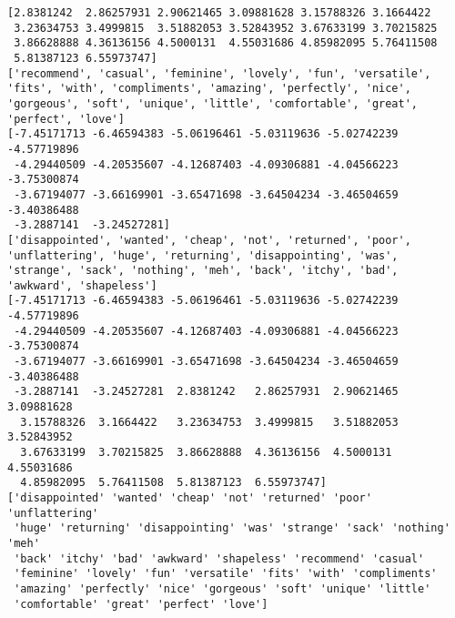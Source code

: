 \documentclass[11pt]{article}
\begin{document}
    \begin{Verbatim}[commandchars=\\\{\}]
[2.8381242  2.86257931 2.90621465 3.09881628 3.15788326 3.1664422
 3.23634753 3.4999815  3.51882053 3.52843952 3.67633199 3.70215825
 3.86628888 4.36136156 4.5000131  4.55031686 4.85982095 5.76411508
 5.81387123 6.55973747]
['recommend', 'casual', 'feminine', 'lovely', 'fun', 'versatile', 'fits', 'with', 'compliments', 'amazing', 'perfectly', 'nice', 'gorgeous', 'soft', 'unique', 'little', 'comfortable', 'great', 'perfect', 'love']
[-7.45171713 -6.46594383 -5.06196461 -5.03119636 -5.02742239 -4.57719896
 -4.29440509 -4.20535607 -4.12687403 -4.09306881 -4.04566223 -3.75300874
 -3.67194077 -3.66169901 -3.65471698 -3.64504234 -3.46504659 -3.40386488
 -3.2887141  -3.24527281]
['disappointed', 'wanted', 'cheap', 'not', 'returned', 'poor', 'unflattering', 'huge', 'returning', 'disappointing', 'was', 'strange', 'sack', 'nothing', 'meh', 'back', 'itchy', 'bad', 'awkward', 'shapeless']
[-7.45171713 -6.46594383 -5.06196461 -5.03119636 -5.02742239 -4.57719896
 -4.29440509 -4.20535607 -4.12687403 -4.09306881 -4.04566223 -3.75300874
 -3.67194077 -3.66169901 -3.65471698 -3.64504234 -3.46504659 -3.40386488
 -3.2887141  -3.24527281  2.8381242   2.86257931  2.90621465  3.09881628
  3.15788326  3.1664422   3.23634753  3.4999815   3.51882053  3.52843952
  3.67633199  3.70215825  3.86628888  4.36136156  4.5000131   4.55031686
  4.85982095  5.76411508  5.81387123  6.55973747]
['disappointed' 'wanted' 'cheap' 'not' 'returned' 'poor' 'unflattering'
 'huge' 'returning' 'disappointing' 'was' 'strange' 'sack' 'nothing' 'meh'
 'back' 'itchy' 'bad' 'awkward' 'shapeless' 'recommend' 'casual'
 'feminine' 'lovely' 'fun' 'versatile' 'fits' 'with' 'compliments'
 'amazing' 'perfectly' 'nice' 'gorgeous' 'soft' 'unique' 'little'
 'comfortable' 'great' 'perfect' 'love']

    \end{Verbatim}

    \begin{center}
    \end{center}
    { \hspace*{\fill} \\}
    
\end{document}
